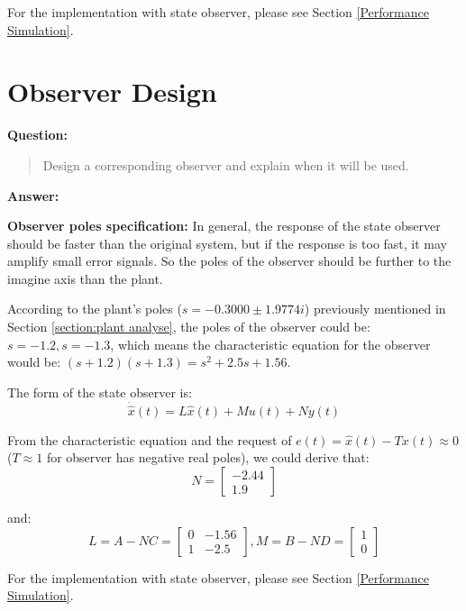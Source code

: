 \documentclass[12pt, oneside]{article}
\begin{document}
For the implementation with state observer, please see Section \ref{Performance Simulation}.


\section{Observer Design}
\textbf{Question:}
\begin{quote}
Design a corresponding observer and explain when it will be used. 
\end{quote}
\textbf{Answer:}

\textbf{Observer poles specification:} In general, the response of the state observer should be faster than the original system, but if the response is too fast, it may amplify small error signals. So the poles of the observer should be further to the imagine axis than the plant.

According to the plant's poles ($s = -0.3000\pm1.9774i$) previously mentioned in Section \ref{section:plant analyse}, the poles of the observer could be: $s=-1.2, s=-1.3$, which means the characteristic equation for the observer would be: $(s+1.2)(s+1.3)=s^2+2.5s+1.56$.

The form of the state observer is:
\begin{equation}
    \dot{\hat{x}}(t) = L\hat{x}(t)+Mu(t)+Ny(t)
\end{equation}

From the characteristic equation and the request of $e(t) = \hat{x}(t)-Tx(t) \approx 0$ ($T \approx 1$ for observer has negative real poles), we could derive that:
\begin{equation}
    N = 
    \left[\begin{array}{ccc}-2.44\\1.9\end{array}\right]
\end{equation}

and:
\begin{equation}
    L = A-NC = \left[\begin{array}{ccc}0&-1.56\\1&-2.5\end{array}\right], 
    M = B-ND = \left[\begin{array}{ccc}1\\0\end{array}\right]
\end{equation}

For the implementation with state observer, please see Section \ref{Performance Simulation}.
\end{document}

